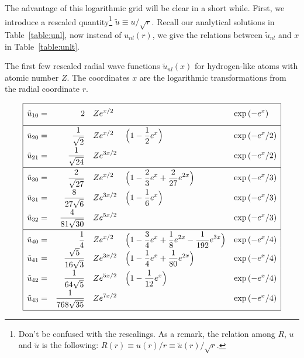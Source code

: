 The advantage of this logarithmic grid will be clear in a short while.
First, we introduce a rescaled quantity\footnote{Don't be confused
with the rescalings. As a remark, the relation among $R$, $u$ and $\tilde{u}$
is the following: $R(r) \equiv u(r)/r \equiv \tilde{u}(r)/\sqrt{r}$.}
$\tilde{u} \equiv u/\sqrt{r}$. Recall our analytical solutions in Table~\ref{table:unl},
now instead of $u_{nl}(r)$, we give the relations between $\tilde{u}_{nl}$ and $x$ in
Table~\ref{table:unlt}.

\begin{table}[h!]
\caption{The first few rescaled radial wave functions
$\tilde{u}_{nl}(x)$ for hydrogen-like atoms with atomic number $Z$. The
coordinates $x$ are the logarithmic transformations from the radial coordinate $r$.}
\label{table:unlt}
\begin{equation*}
\renewcommand\arraystretch{1.8}
\begin{array}{|>{\displaystyle}r >{\displaystyle}r >{\displaystyle}l >{\displaystyle}l >{\displaystyle}l|}
  \hline
  \tilde{u}_{10} = & 2                           & Ze^{x/2}  &                                                                    & \exp{(-e^{x})}   \\[0.5em] \hline
  \tilde{u}_{20} = & \frac{1}{\sqrt{2}}          & Ze^{x/2}  & \Big(1-\frac{1}{2}e^{x}\Big)                                       & \exp{(-e^{x}/2)} \\
  \tilde{u}_{21} = & \frac{1}{\sqrt{24}}         & Ze^{3x/2} &                                                                    & \exp{(-e^{x}/2)} \\[0.5em] \hline
  \tilde{u}_{30} = & \frac{2}{\sqrt{27}}         & Ze^{x/2}  & \Big(1-\frac{2}{3}e^{x}+\frac{2}{27}e^{2x}\Big)                    & \exp{(-e^{x}/3)} \\
  \tilde{u}_{31} = & \frac{8}{27\sqrt{6}}        & Ze^{3x/2} & \Big(1-\frac{1}{6}e^{x}\Big)                                       & \exp{(-e^{x}/3)} \\
  \tilde{u}_{32} = & \frac{4}{81\sqrt{30}}       & Ze^{5x/2} &                                                                    & \exp{(-e^{x}/3)} \\[0.5em] \hline
  \tilde{u}_{40} = & \frac{1}{4}                 & Ze^{x/2}  & \Big(1-\frac{3}{4}e^{x}+\frac{1}{8}e^{2x}-\frac{1}{192}e^{3x}\Big) & \exp{(-e^{x}/4)} \\
  \tilde{u}_{41} = & \frac{\sqrt{5}}{16\sqrt{3}} & Ze^{3x/2} & \Big(1-\frac{1}{4}e^{x}+\frac{1}{80}e^{2x}\Big)                    & \exp{(-e^{x}/4)} \\
  \tilde{u}_{42} = & \frac{1}{64\sqrt{5}}        & Ze^{5x/2} & \Big(1-\frac{1}{12}e^{x}\Big)                                      & \exp{(-e^{x}/4)} \\
  \tilde{u}_{43} = & \frac{1}{768\sqrt{35}}      & Ze^{7x/2} &                                                                    & \exp{(-e^{x}/4)} \\[0.5em]
  \hline
\end{array}
\end{equation*}
\end{table}

